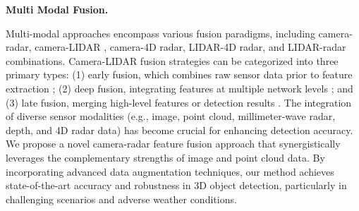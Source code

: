 \noindent
\textbf{Multi Modal Fusion.}


Multi-modal approaches encompass various fusion paradigms, including camera-radar, camera-LIDAR \cite{li2024fast,li2023poly}, camera-4D radar, LIDAR-4D radar, and LIDAR-radar combinations. Camera-LIDAR fusion strategies can be categorized into three primary types: (1) early fusion, which combines raw sensor data prior to feature extraction \cite{lang2019pointpillars,PointNet2018}; (2) deep fusion, integrating features at multiple network levels \cite{li2024fast,li2023poly}; and (3) late fusion, merging high-level features or detection results \cite{CLOCs2020,Fast-CLOCs2022}. The integration of diverse sensor modalities (e.g., image, point cloud, millimeter-wave radar, depth, and 4D radar data) has become crucial for enhancing detection accuracy. We propose a novel camera-radar feature fusion approach that synergistically leverages the complementary strengths of image and point cloud data. By incorporating advanced data augmentation techniques, our method achieves state-of-the-art accuracy and robustness in 3D object detection, particularly in challenging scenarios and adverse weather conditions.


